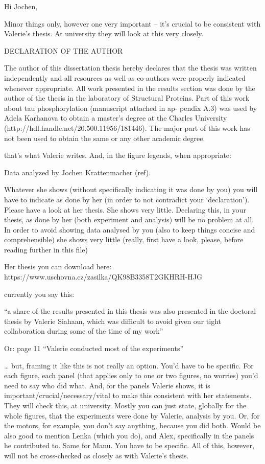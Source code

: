 Hi Jochen, 


Minor things only, however one very important – it’s crucial to be consistent with Valerie’s thesis. At university they will look at this very closely.

DECLARATION OF THE AUTHOR 

The author of this dissertation thesis hereby declares that the thesis was written independently and all resources as well as co-authors were properly indicated whenever appropriate. All work presented in the results section was done by the author of the thesis in the laboratory of Structural Proteins. Part of this work about tau phosphorylation (manuscript attached in ap- pendix A.3) was used by Adela Karhanova to obtain a master’s degree at the Charles University (http://hdl.handle.net/20.500.11956/181446). The major part of this work has not been used to obtain the same or any other academic degree. 

that’s what Valerie writes. And, in the figure legends, when appropriate: 

Data analyzed by Jochen Krattenmacher (ref). 

Whatever she shows (without specifically indicating it was done by you) you will have to indicate as done by her (in order to not contradict your ‘declaration’). Please have a look at her thesis. She shows very little. Declaring this, in your thesis, as done by her (both experiment and analysis) will be no problem at all. In order to avoid showing data analysed by you (also to keep things concise and comprehensible) she shows very little (really, first have a look, please, before reading further in this file)

Her thesis you can download here: 
https://www.uschovna.cz/zasilka/QK98B3358T2GKHRH-HJG

currently you say this:

“a share of the results presented in this thesis was also presented in the doctoral thesis by Valerie Siahaan, which was difficult to avoid given our tight collaboration during some of the time of my work” 

Or: page 11 “Valerie conducted most of the experiments”

… but, framing it like this is not really an option. You’d have to be specific. For each figure, each panel (that applies only to one or two figures, no worries) you’d need to say who did what. And, for the panels Valerie shows, it is important/crucial/necessary/vital to make this consistent with her statements. They will check this, at university. Mostly you can just state, globally for the whole figures, that the experiments were done by Valerie, analysis by you. Or, for the motors, for example, you don’t say anything, because you did both. Would be also good to mention Lenka (which you do), and Alex, specifically in the panels he contributed to. Same for Manu. You have to be specific. All of this, however, will not be cross-checked as closely as with Valerie’s thesis.

